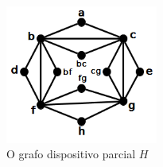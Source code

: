 \begin{figure}[htb]	
\center%
\includegraphics[width=5cm]{./img/gadgetBase.png}
\caption{O grafo dispositivo parcial $H$}
\label{fig:gadgetBase}
\end{figure}